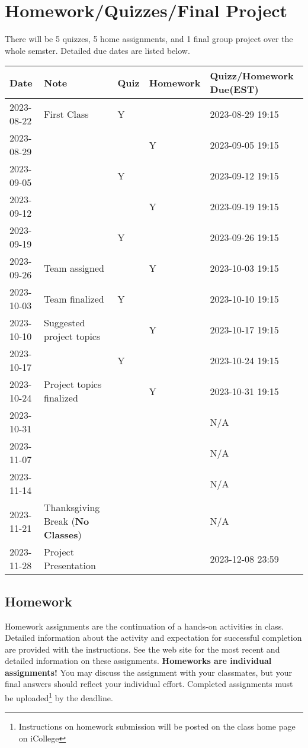 \documentclass{article}
\begin{document}
\section{Homework/Quizzes/Final Project}
There will be 5 quizzes, 5 home assignments, and 1 final group project over the whole semster. Detailed due dates are listed below.
\begin{center}
	\begin{tabular}{lllll}
		\hline
		Date & Note & Quiz & Homework & Quizz/Homework Due(EST) \\
		\hline
		2023-08-22 & First Class & Y &  & 2023-08-29 19:15 \\
    2023-08-29 &  &  & Y & 2023-09-05 19:15 \\
    2023-09-05 &  & Y &   & 2023-09-12 19:15 \\
    2023-09-12 &  &  & Y &  2023-09-19 19:15\\
    2023-09-19 &  & Y &  & 2023-09-26 19:15 \\
    2023-09-26 & Team assigned &  & Y & 2023-10-03 19:15 \\
    2023-10-03 & Team finalized  & Y &  & 2023-10-10 19:15 \\
    2023-10-10 & Suggested project topics &  & Y & 2023-10-17 19:15 \\
    2023-10-17 &  & Y &  & 2023-10-24 19:15 \\
    2023-10-24 & Project topics finalized &  & Y & 2023-10-31 19:15 \\
    2023-10-31 &  &  &  &  N/A\\
    2023-11-07 &  &  &  &  N/A\\
    2023-11-14 &  &  &  &  N/A\\
    2023-11-21 & Thanksgiving Break (\textbf{No Classes})  &  &  &  N/A\\
		2023-11-28 & Project Presentation &  &  & 2023-12-08 23:59\\
		\hline        
	\end{tabular}
\end{center}



\subsection{Homework}
Homework assignments are the continuation of a hands-on activities in class. Detailed information about the activity and expectation for successful completion are provided with the instructions. See the web site for the most recent and detailed information on these assignments. \textbf{Homeworks are individual assignments!} You may discuss the assignment with your classmates, but your ﬁnal answers should reﬂect your individual eﬀort. Completed assignments must be uploaded\footnote{Instructions on homework submission will be posted on the class home page on iCollege} by the deadline.
\end{document}
